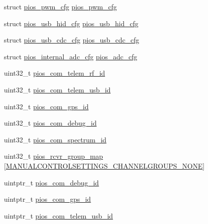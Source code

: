 \begin{DoxyCompactItemize}
\item 
struct \hyperlink{structpios__pwm__cfg}{pios\-\_\-pwm\-\_\-cfg} \hyperlink{group___revolution_ga7587f8e174df90bef8cec1edfa9e14c1}{pios\-\_\-pwm\-\_\-cfg}
\item 
struct \hyperlink{structpios__usb__hid__cfg}{pios\-\_\-usb\-\_\-hid\-\_\-cfg} \hyperlink{group___revolution_ga3665f6d3a2cccc431b55b9432291e94c}{pios\-\_\-usb\-\_\-hid\-\_\-cfg}
\item 
struct \hyperlink{structpios__usb__cdc__cfg}{pios\-\_\-usb\-\_\-cdc\-\_\-cfg} \hyperlink{group___revolution_ga05cc3e449d417c7f9097d2659e6f5ca3}{pios\-\_\-usb\-\_\-cdc\-\_\-cfg}
\item 
struct \hyperlink{structpios__internal__adc__cfg}{pios\-\_\-internal\-\_\-adc\-\_\-cfg} \hyperlink{group___revolution_ga80651408284e662b6dacdf65367ba291}{pios\-\_\-adc\-\_\-cfg}
\item 
uint32\-\_\-t \hyperlink{group___revolution_ga81f6bbc74499d8041b498fd84393191e}{pios\-\_\-com\-\_\-telem\-\_\-rf\-\_\-id}
\item 
uint32\-\_\-t \hyperlink{group___revolution_ga1ec5827cb1b86c4db093bbd681d6960e}{pios\-\_\-com\-\_\-telem\-\_\-usb\-\_\-id}
\item 
uint32\-\_\-t \hyperlink{group___revolution_gaaf87638a9e94d36dff49d099d8f82d62}{pios\-\_\-com\-\_\-gps\-\_\-id}
\item 
uint32\-\_\-t \hyperlink{group___revolution_ga878940feb45259397eeea38aafcdb8fd}{pios\-\_\-com\-\_\-debug\-\_\-id}
\item 
uint32\-\_\-t \hyperlink{group___revolution_gaec1ba37a7abfd74ce0bc4b9a610269c9}{pios\-\_\-com\-\_\-spectrum\-\_\-id}
\item 
uint32\-\_\-t \hyperlink{group___revolution_ga6c6cfc16eb738e47c123298e062297e2}{pios\-\_\-rcvr\-\_\-group\-\_\-map} \mbox{[}\hyperlink{group___manual_control_settings_gga94e1fe696fef2f85cbdb4a2e479c7ed2af9104b4e2c50328b0912db1e10fc3074}{\-M\-A\-N\-U\-A\-L\-C\-O\-N\-T\-R\-O\-L\-S\-E\-T\-T\-I\-N\-G\-S\-\_\-\-C\-H\-A\-N\-N\-E\-L\-G\-R\-O\-U\-P\-S\-\_\-\-N\-O\-N\-E}\mbox{]}
\item 
uintptr\-\_\-t \hyperlink{group___revolution_ga14dc9e3d330b80a37a9699c2112358e0}{pios\-\_\-com\-\_\-debug\-\_\-id}
\item 
uintptr\-\_\-t \hyperlink{group___revolution_ga05dca72c42c6c2b33fa62b8ee0fcb2ea}{pios\-\_\-com\-\_\-gps\-\_\-id}
\item 
uintptr\-\_\-t \hyperlink{group___revolution_ga513cc36d72b76de2fcb75ff233a79a4a}{pios\-\_\-com\-\_\-telem\-\_\-usb\-\_\-id}

\end{DoxyCompactItemize}
